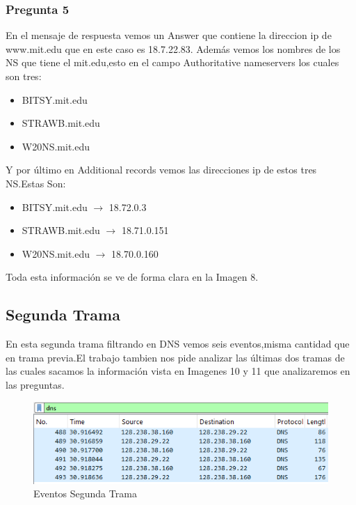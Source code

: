 \documentclass{article}
\begin{document}
\subsubsection{Pregunta 5}
En el mensaje de respuesta vemos un Answer que contiene la direccion ip de www.mit.edu que en este caso es 18.7.22.83.
Además vemos los nombres de los NS que tiene el mit.edu,esto en el campo Authoritative nameservers  los cuales son tres:

\begin{itemize}
\item BITSY.mit.edu
\item STRAWB.mit.edu
\item W20NS.mit.edu
\end{itemize}

Y por último en Additional records vemos las direcciones ip de estos tres NS.Estas Son:

\begin{itemize}
\item BITSY.mit.edu $\rightarrow$  18.72.0.3
\item STRAWB.mit.edu $\rightarrow$ 18.71.0.151
\item W20NS.mit.edu $\rightarrow$ 18.70.0.160
\end{itemize}

Toda esta información se ve de forma clara en la Imagen 8.

\newpage

\subsection{Segunda Trama}

En esta segunda trama filtrando en DNS vemos seis eventos,misma cantidad que en trama previa.El trabajo tambien nos pide analizar las últimas dos tramas de las cuales sacamos la información vista en Imagenes 10 y 11 que analizaremos en las preguntas.

\begin{figure}[h]
    \centering
    \includegraphics[width=1\linewidth]{Fotos/SegundaTramaEventos.png}
    \caption{Eventos Segunda Trama}
\end{figure}
\end{document}
